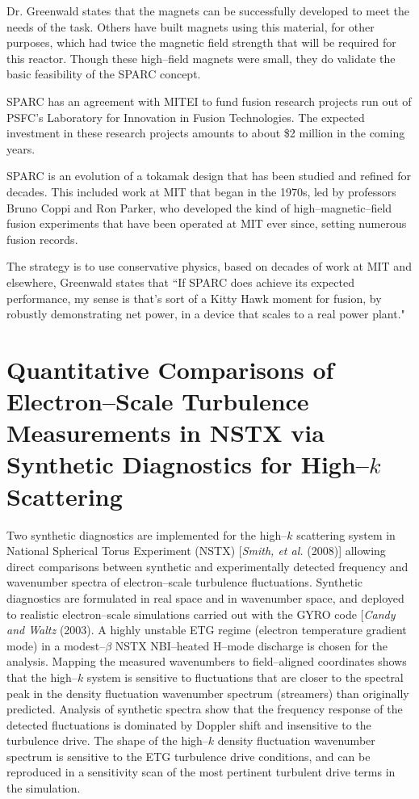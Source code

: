 \documentclass[a4paper,openany,12pt]{report}
\begin{document}
Dr. Greenwald states that the magnets can be successfully developed to meet the needs of the task. Others have built magnets using this material, for other purposes, which had twice the magnetic field strength that will be required for this reactor. Though these high--field magnets were small, they do validate the basic feasibility of the SPARC concept.

SPARC has an agreement with MITEI to fund fusion research projects run out of PSFC's Laboratory for Innovation in Fusion Technologies. The expected investment in these research projects amounts to about \$2 million in the coming years.

SPARC is an evolution of a tokamak design that has been studied and refined for decades. This included work at MIT that began in the 1970s, led by professors Bruno Coppi and Ron Parker, who developed the kind of high--magnetic--field fusion experiments that have been operated at MIT ever since, setting numerous fusion records.

The strategy is to use conservative physics, based on decades of work at MIT and elsewhere, Greenwald states that ``If SPARC does achieve its expected performance, my sense is that's sort of a Kitty Hawk moment for fusion, by robustly demonstrating net power, in a device that scales to a real power plant."

\section{Quantitative Comparisons of Electron--Scale Turbulence Measurements in NSTX via Synthetic Diagnostics for High--$k$ Scattering}

Two synthetic diagnostics are implemented for the high--$k$ scattering system in National Spherical Torus Experiment (NSTX) [\emph{Smith, et al.} (2008)] allowing direct comparisons between synthetic and experimentally detected frequency and wavenumber spectra of electron--scale turbulence fluctuations.  Synthetic diagnostics are formulated in real space and in wavenumber space, and deployed to realistic electron--scale simulations carried out with the GYRO code [\emph{Candy and  Waltz} (2003).  A highly unstable ETG regime (electron temperature gradient mode) in a modest--$\beta$ NSTX NBI--heated H--mode discharge is chosen for the analysis.  Mapping the measured wavenumbers to field--aligned coordinates shows that the high--$k$ system is sensitive to fluctuations that are closer to the spectral peak in the density fluctuation wavenumber spectrum (streamers) than originally predicted.  Analysis of synthetic spectra show that the frequency response of the detected fluctuations is dominated by Doppler shift and insensitive to the turbulence drive. The shape of the high--$k$ density fluctuation wavenumber spectrum is sensitive to the ETG turbulence drive conditions, and can be reproduced in a sensitivity scan of the most pertinent turbulent drive terms in the simulation. 
\end{document}
